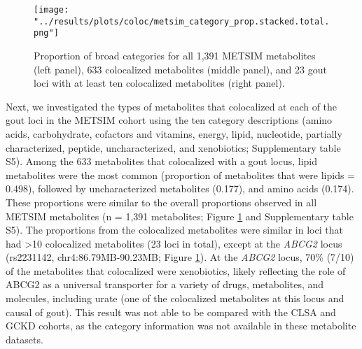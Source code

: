 \documentclass[a4paper,10pt]{article}
\begin{document}
\begin{figure}[t]
	\hspace{-30pt}
	\texttt{[image: "../results/plots/coloc/metsim\_category\_prop.stacked.total.png"]}
	\caption{Proportion of broad categories for all 1,391 METSIM metabolites (left panel), 633 colocalized metabolites (middle panel), and 23 gout loci with at least ten colocalized metabolites (right panel).}
	\label{fig:metsim_category}
\end{figure}

Next, we investigated the types of metabolites that colocalized at each of the gout loci in the METSIM cohort using the ten category descriptions (amino acids, carbohydrate, cofactors and vitamins, energy, lipid, nucleotide, partially characterized, peptide, uncharacterized, and xenobiotics; Supplementary table S5).
Among the 633 metabolites that colocalized with a gout locus, lipid metabolites were the most common (proportion of metabolites that were lipids = 0.498), followed by uncharacterized metabolites (0.177), and amino acids (0.174).
These proportions were similar to the overall proportions observed in all METSIM metabolites (n = 1,391 metabolites; Figure \ref{fig:metsim_category} and Supplementary table S5).
The proportions from the colocalized metabolites were similar in loci that had >10 colocalized metabolites (23 loci in total), except at the \textit{ABCG2} locus (rs2231142, chr4:86.79MB-90.23MB; Figure \ref{fig:metsim_category}).
At the \textit{ABCG2} locus, 70\% (7/10) of the metabolites that colocalized were xenobiotics, likely reflecting the role of ABCG2 as a universal transporter for a variety of drugs, metabolites, and molecules\citep{austin_doyle_multidrug_2003}, including urate (one of the colocalized metabolites at this locus and causal of gout).
This result was not able to be compared with the CLSA and GCKD cohorts, as the category information was not available in these metabolite datasets.
\\


\end{document}
